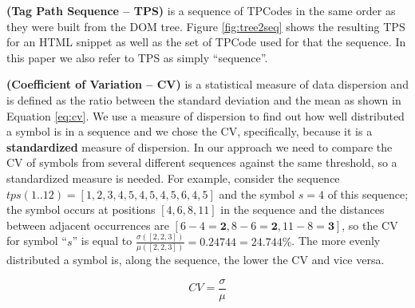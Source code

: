\begin{definition}\textbf{(Tag Path Sequence -- TPS)} is a sequence of TPCodes
in the same order as they were built from the DOM tree. Figure \ref{fig:tree2seq} shows
the resulting TPS for an HTML snippet as  well as the set of TPCode used for that
the sequence. In this paper we also refer to TPS as simply ``sequence''.
\end{definition}

\begin{definition}\textbf{(Coefficient of Variation -- CV)}\label{def:cv} is a
statistical measure of data dispersion and is defined as the ratio between the
standard deviation and the mean as shown in Equation
\ref{eq:cv}\cite{CVeveritt2006cambridge}. We use a measure of dispersion to find
out how well distributed a symbol is in a sequence and we chose the CV,
specifically, because it is a \textbf{standardized} measure of dispersion. In
our approach we need to compare the CV of symbols from several different
sequences against the same threshold, so a standardized measure is needed.
For example, consider the sequence $tps(1..12)=[1,2,3,4,5,4,5,4,5,6,4,5]$ and
the symbol $s=4$ of this sequence; the symbol occurs at positions $[4,6,8,11]$
in the sequence and the distances between adjacent occurrences are
$[6-4=\textbf{2},8-6=\textbf{2},11-8=\textbf{3}]$, so the CV for symbol ``$s$''
is equal to $\frac{\sigma([2, 2, 3])}{\mu([2, 2, 3])}=0.24744=24.744\%$. The
more evenly distributed a symbol is, along the sequence, the lower the CV and
vice versa.

\begin{small}
\begin{equation}\label{eq:cv}
    CV=\frac{\sigma}{\mu}
\end{equation}
\end{small}
\end{definition}

